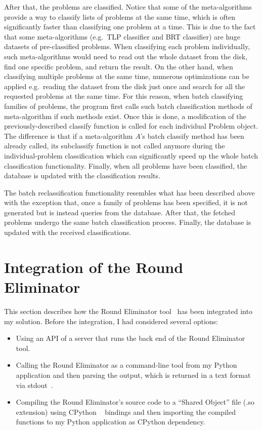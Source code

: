 After that, the problems are classified. Notice that
some of the meta-algorithms provide a way to classify
lists of problems at the same time, which is often
significantly faster than classifying one problem at a time.
This is due to the fact that some meta-algorithms
(e.g.\ TLP classifier and BRT classifier) are
huge datasets of pre-classified problems. When
classifying each problem individually, such
meta-algorithms would need to read out the whole
dataset from the disk, find one specific problem,
and return the result. On the other hand, when
classifying multiple problems at the same time,
numerous optimizations can be applied e.g.\ reading the 
dataset from the disk just once and search for all
the requested problems at the same time. For this reason,
when batch classifying families of problems, the program first
calls such batch classification methods of meta-algorithm
if such methods exist. Once this is done, a modification
of the previously-described classify function is called
for each individual Problem object. The difference is
that if a meta-algorithm $A$'s batch classify method has been
already called, its subclassify function is not called
anymore during the individual-problem classification which
can significantly speed up the whole batch classification
functionality. Finally, when all problems have been classified,
the database is updated with the classification results.

The batch reclassification functionality resembles
what has been described above with the exception that,
once a family of problems has been specified, it is
not generated but is instead queries from the database.
After that, the fetched problems undergo the same
batch classification process. Finally, the database is
updated with the received classifications.

\section{Integration of the Round Eliminator}

This section describes how the Round Eliminator
tool~\cite{Olivetti2020} has been integrated into my solution.
Before the integration, I had considered several options:

\begin{itemize}
  \item Using an API of a server that runs the back end of the Round Eliminator tool.
  \item Calling the Round Eliminator as a command-line tool from my Python
  application and then parsing the output, which is returned
  in a text format via stdout~\cite{stdio}.
  \item Compiling the Round Eliminator's source code to a ``Shared Object'' file (.so extension)
  using CPython ~\cite{CPython} bindings and then importing the compiled
  functions to my Python application as CPython dependency.
\end{itemize}

